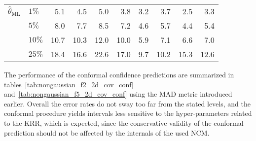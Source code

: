 \documentclass[a4paper,14pt]{extarticle}
\begin{document}
\begin{table}
\begin{tabular}{ll||rrrr|rrrr}
  \midrule
  $\hat{\theta}_\text{ML}$ & $1\%$ &      5.1 &      4.5 &      5.0 &      3.8 &      3.2 &      3.7 &      2.5 &      3.3 \\
       & $5\%$ &      8.0 &      7.7 &      8.5 &      7.2 &      4.6 &      5.7 &      4.4 &      5.4 \\
       & $10\%$ &     10.7 &     10.3 &     12.0 &     10.0 &      5.9 &      7.1 &      6.6 &      7.0 \\
       & $25\%$ &     18.4 &     16.6 &     22.6 &     17.0 &      9.7 &     10.2 &     15.3 &     12.6 \\
  \bottomrule
  \end{tabular}
\end{table}

The performance of the conformal confidence predictions are summarized in tables~\ref{tab:nongaussian_f2_2d_cov_conf}
and~\ref{tab:nongaussian_f5_2d_cov_conf} using the MAD metric introduced earlier.
Overall the error rates do not sway too far from the stated levels, and the conformal
procedure yields intervals less sensitive to the hyper-parameters related to the KRR,
which is expected, since the conservative validity of the conformal prediction should
not be affected by the internals of the used NCM.
\end{document}

